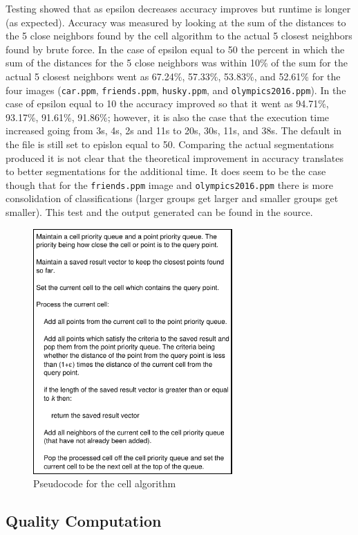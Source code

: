 \documentclass[twocolumn]{article}
\begin{document}
Testing showed that as epsilon decreases accuracy improves but runtime is
longer (as expected). Accuracy was measured by looking at the sum of the
distances to the 5 close neighbors found by the cell algorithm to the actual 5
closest neighbors found by brute force. In the case of epsilon equal to 50 the
percent in which the sum of the distances for the 5 close neighbors was within
10\% of the sum for the actual 5 closest neighbors went as 67.24\%, 57.33\%,
53.83\%, and 52.61\% for the four images (\texttt{car.ppm},
\texttt{friends.ppm}, \texttt{husky.ppm}, and \texttt{olympics2016.ppm}). In
the case of epsilon equal to 10 the accuracy improved so that it went as
94.71\%, 93.17\%, 91.61\%, 91.86\%; however, it is also the case that the
execution time increased going from 3s, 4s, 2s and 11s to 20s, 30s, 11s, and
38s. The default in the file is still set to epislon equal to 50. Comparing
the actual segmentations produced it is not clear that the theoretical
improvement in accuracy translates to better segmentations for the additional
time. It does seem to be the case though that for the \texttt{friends.ppm}
image and \texttt{olympics2016.ppm} there is more consolidation of
classifications (larger groups get larger and smaller groups get
smaller). This test and the output generated can be found in the source. 


\begin{figure}[!t]
\centering
\includegraphics[width=3in]{cell}
\caption{Pseudocode for the cell algorithm}
\label{fig:cell}
\end{figure}


\subsection{Quality Computation}
\end{document}
